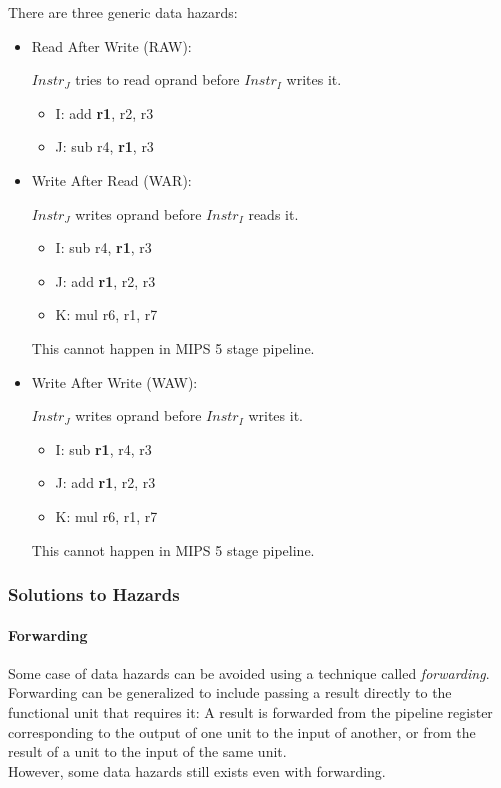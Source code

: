 \documentclass[12pt, a4paper]{article}
\theoremstyle{margin}
\begin{document}
	  There are three generic data hazards\cite{ppt}:
	  \begin{itemize}
		\item Read After Write (RAW):

		$Instr_J$ tries to read oprand before $Instr_I$ writes it.
		\begin{itemize}
		  \item I: add \textbf{r1}, r2, r3
		  \item J: sub r4, \textbf{r1}, r3
		\end{itemize}

		\item Write After Read (WAR):

		$Instr_J$ writes oprand before $Instr_I$ reads it.
		\begin{itemize}
		  \item I: sub r4, \textbf{r1}, r3
		  \item J: add \textbf{r1}, r2, r3
		  \item K: mul r6, r1, r7
		\end{itemize}
		This cannot happen in MIPS 5 stage pipeline.

		\item Write After Write (WAW):

		$Instr_J$ writes oprand before $Instr_I$ writes it.
		\begin{itemize}
		  \item I: sub \textbf{r1}, r4, r3
		  \item J: add \textbf{r1}, r2, r3
		  \item K: mul r6, r1, r7
		\end{itemize}
		This cannot happen in MIPS 5 stage pipeline.

	  \end{itemize}

	\subsubsection{Solutions to Hazards}

	  \paragraph{Forwarding}
	  Some case of data hazards can be avoided using a technique called \emph{forwarding}. Forwarding can be generalized to include passing a result directly to the functional unit that requires it: A result is forwarded from the pipeline register corresponding to the output of one unit to the input of another, or from the result of a unit to the input of the same unit.\cite{caqa}\\
	  However, some data hazards still exists even with forwarding.
\end{document}
